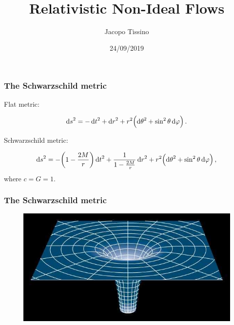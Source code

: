 \documentclass{beamer}
\title{Relativistic Non-Ideal Flows}
\author{Jacopo Tissino}
\date{24/09/2019}
\begin{document}
\frame{\titlepage}

\begin{frame}
    \frametitle{The Schwarzschild metric}
    Flat metric:

    \begin{equation*}
        \dd{s}^2 = -\dd{t}^2 + \dd{r}^2 + r^2 \qty(\dd{\theta}^2 + \sin^2\theta \dd{\varphi})\,.
    \end{equation*}

    Schwarzschild metric:

    \begin{equation*}
        \dd{s}^2 = -\qty(1-\frac{2M}{r})\dd{t}^2 + \frac{1}{1-\frac{2M}{r}} \dd{r}^2
        + r^2 \qty(\dd{\theta}^2 + \sin^2\theta \dd{\varphi})\,,
    \end{equation*}
    where \(c = G = 1\).


\end{frame}

\begin{frame}
    \frametitle{The Schwarzschild metric}
    \begin{figure}
        \includegraphics[width=\textwidth]{figures/Schwarzschild-Space}
    \end{figure}

\end{frame}
\end{document}
